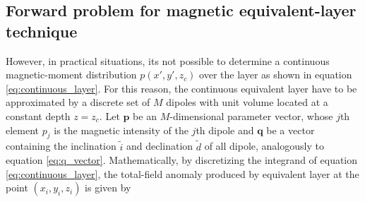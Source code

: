 
















\subsection{Forward problem for magnetic equivalent-layer technique}

However, in practical situations, its not possible to determine a continuous magnetic-moment distribution $p(x',y',z_c)$ over the layer as shown in equation \ref{eq:continuous_layer}. For this reason, the continuous equivalent layer have to be approximated  by a discrete set of $M$ dipoles with unit volume located at a constant depth $z = z_c$. Let $\mathbf{p}$ be an $M$-dimensional parameter vector, whose $j$th element $p_j$ is the magnetic intensity of the $j$th dipole and $\mathbf{q}$ be a vector containing the inclination $\tilde{i}$ and declination $\tilde{d}$ of all dipole, analogously to equation \ref{eq:q_vector}. Mathematically, by discretizing the integrand of equation \ref{eq:continuous_layer}, the total-field anomaly produced by equivalent layer at the point $(x_i,y_i,z_i)$ is given by     


